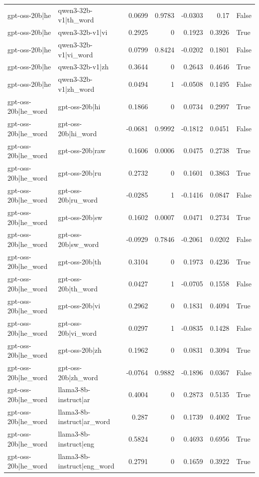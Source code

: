\begin{table}
\begin{tabular}{l l r r r r l}
gpt-oss-20b|he & qwen3-32b-v1|th_word & 0.0699 & 0.9783 & -0.0303 & 0.17 & False \\
gpt-oss-20b|he & qwen3-32b-v1|vi & 0.2925 & 0 & 0.1923 & 0.3926 & True \\
gpt-oss-20b|he & qwen3-32b-v1|vi_word & 0.0799 & 0.8424 & -0.0202 & 0.1801 & False \\
gpt-oss-20b|he & qwen3-32b-v1|zh & 0.3644 & 0 & 0.2643 & 0.4646 & True \\
gpt-oss-20b|he & qwen3-32b-v1|zh_word & 0.0494 & 1 & -0.0508 & 0.1495 & False \\
gpt-oss-20b|he_word & gpt-oss-20b|hi & 0.1866 & 0 & 0.0734 & 0.2997 & True \\
gpt-oss-20b|he_word & gpt-oss-20b|hi_word & -0.0681 & 0.9992 & -0.1812 & 0.0451 & False \\
gpt-oss-20b|he_word & gpt-oss-20b|raw & 0.1606 & 0.0006 & 0.0475 & 0.2738 & True \\
gpt-oss-20b|he_word & gpt-oss-20b|ru & 0.2732 & 0 & 0.1601 & 0.3863 & True \\
gpt-oss-20b|he_word & gpt-oss-20b|ru_word & -0.0285 & 1 & -0.1416 & 0.0847 & False \\
gpt-oss-20b|he_word & gpt-oss-20b|sw & 0.1602 & 0.0007 & 0.0471 & 0.2734 & True \\
gpt-oss-20b|he_word & gpt-oss-20b|sw_word & -0.0929 & 0.7846 & -0.2061 & 0.0202 & False \\
gpt-oss-20b|he_word & gpt-oss-20b|th & 0.3104 & 0 & 0.1973 & 0.4236 & True \\
gpt-oss-20b|he_word & gpt-oss-20b|th_word & 0.0427 & 1 & -0.0705 & 0.1558 & False \\
gpt-oss-20b|he_word & gpt-oss-20b|vi & 0.2962 & 0 & 0.1831 & 0.4094 & True \\
gpt-oss-20b|he_word & gpt-oss-20b|vi_word & 0.0297 & 1 & -0.0835 & 0.1428 & False \\
gpt-oss-20b|he_word & gpt-oss-20b|zh & 0.1962 & 0 & 0.0831 & 0.3094 & True \\
gpt-oss-20b|he_word & gpt-oss-20b|zh_word & -0.0764 & 0.9882 & -0.1896 & 0.0367 & False \\
gpt-oss-20b|he_word & llama3-8b-instruct|ar & 0.4004 & 0 & 0.2873 & 0.5135 & True \\
gpt-oss-20b|he_word & llama3-8b-instruct|ar_word & 0.287 & 0 & 0.1739 & 0.4002 & True \\
gpt-oss-20b|he_word & llama3-8b-instruct|eng & 0.5824 & 0 & 0.4693 & 0.6956 & True \\
gpt-oss-20b|he_word & llama3-8b-instruct|eng_word & 0.2791 & 0 & 0.1659 & 0.3922 & True \\

\end{tabular}
\end{table}
